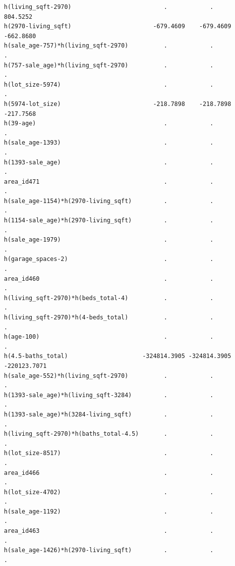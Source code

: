 \documentclass[
]{article}
\begin{document}
\begin{verbatim}
h(living_sqft-2970)                          .            .          804.5252
h(2970-living_sqft)                       -679.4609    -679.4609    -662.8680
h(sale_age-757)*h(living_sqft-2970)          .            .            .     
h(757-sale_age)*h(living_sqft-2970)          .            .            .     
h(lot_size-5974)                             .            .            .     
h(5974-lot_size)                          -218.7898    -218.7898    -217.7568
h(39-age)                                    .            .            .     
h(sale_age-1393)                             .            .            .     
h(1393-sale_age)                             .            .            .     
area_id471                                   .            .            .     
h(sale_age-1154)*h(2970-living_sqft)         .            .            .     
h(1154-sale_age)*h(2970-living_sqft)         .            .            .     
h(sale_age-1979)                             .            .            .     
h(garage_spaces-2)                           .            .            .     
area_id460                                   .            .            .     
h(living_sqft-2970)*h(beds_total-4)          .            .            .     
h(living_sqft-2970)*h(4-beds_total)          .            .            .     
h(age-100)                                   .            .            .     
h(4.5-baths_total)                     -324814.3905 -324814.3905 -220123.7071
h(sale_age-552)*h(living_sqft-2970)          .            .            .     
h(1393-sale_age)*h(living_sqft-3284)         .            .            .     
h(1393-sale_age)*h(3284-living_sqft)         .            .            .     
h(living_sqft-2970)*h(baths_total-4.5)       .            .            .     
h(lot_size-8517)                             .            .            .     
area_id466                                   .            .            .     
h(lot_size-4702)                             .            .            .     
h(sale_age-1192)                             .            .            .     
area_id463                                   .            .            .     
h(sale_age-1426)*h(2970-living_sqft)         .            .            .     
                                                                               

\end{verbatim}
\end{document}
